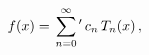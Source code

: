 \[f(x)=\sideset{}{{}^{\prime}}{\sum}_{n=0}^{\infty}c_{n}\mathop{T_{n}\/}%
\nolimits\!\left(x\right),\]